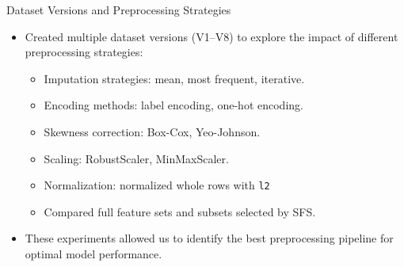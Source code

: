\documentclass{beamer}
\begin{document}
\begin{frame}{Dataset Versions and Preprocessing Strategies}
        \begin{itemize}
                \item Created multiple dataset versions (V1–V8) to explore the
                        impact of different preprocessing strategies:
                        \begin{itemize}
                                \item Imputation strategies: mean, most
                                        frequent, iterative.
                                \item Encoding methods: label encoding, one-hot
                                        encoding.
                                \item Skewness correction: Box-Cox,
                                        Yeo-Johnson.
                                \item Scaling: RobustScaler, MinMaxScaler.
                                \item Normalization: normalized whole rows with
                                        \texttt{l2}
                                \item Compared full feature sets and subsets
                                        selected by SFS.
                        \end{itemize}
                \item These experiments allowed us to identify the best
                        preprocessing pipeline for optimal model performance.
        \end{itemize}
\end{frame}
\end{document}
